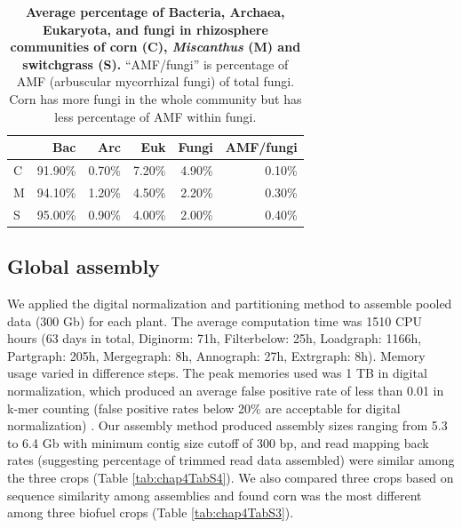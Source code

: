 \documentclass[]{msu-thesis}
\begin{document}
\begin{table}[htbp]
  \centering
  \caption[Average percentage of Bacteria, Archaea, Eukaryota, and fungi
  in rhizosphere communities of corn (C), \textit{Miscanthus} (M) and
switchgrass (S)]{\textbf{Average percentage of Bacteria, Archaea,
  Eukaryota, and fungi in rhizosphere communities of corn (C),
  \textit{Miscanthus} (M) and switchgrass (S).}  ``AMF/fungi'' is
percentage of AMF (arbuscular mycorrhizal  fungi) of total fungi.  Corn
has more fungi in the whole community but has less percentage of AMF
within fungi.}
    \begin{tabular}{|lrrrrr|}
    \toprule
          & Bac   & Arc   & Euk   & Fungi & AMF/fungi \\
    \midrule
    C     & 91.90\% & 0.70\% & 7.20\% & 4.90\% & 0.10\% \\
    M     & 94.10\% & 1.20\% & 4.50\% & 2.20\% & 0.30\% \\
    S     & 95.00\% & 0.90\% & 4.00\% & 2.00\% & 0.40\% \\
    \bottomrule
    \end{tabular}%
  \label{tab:chap4TabS5}%
\end{table}%




\subsection{Global assembly}
We applied the digital normalization and partitioning method
\cite{howe_tackling_2014} to assemble pooled data (300 Gb) for each
plant. The average computation time was 1510 CPU hours (63 days in
total, Diginorm: 71h, Filterbelow: 25h, Loadgraph: 1166h, Partgraph:
205h, Mergegraph: 8h, Annograph: 27h, Extrgraph: 8h). Memory usage
varied in difference steps. The peak memories used was 1 TB in digital
normalization, which produced an average false positive rate of less
than 0.01 in k-mer counting (false positive rates below 20\% are
acceptable for digital normalization) \cite{zhang_these_2014}. Our
assembly method produced assembly sizes ranging from 5.3 to 6.4 Gb with
minimum contig size cutoff of 300 bp, and read mapping back rates
(suggesting percentage of trimmed read data assembled) were similar
among the three crops (Table \ref{tab:chap4TabS4}). We also compared
three crops based on sequence similarity among assemblies and found corn
was the most different among three biofuel crops (Table
\ref{tab:chap4TabS3}).
\end{document}
